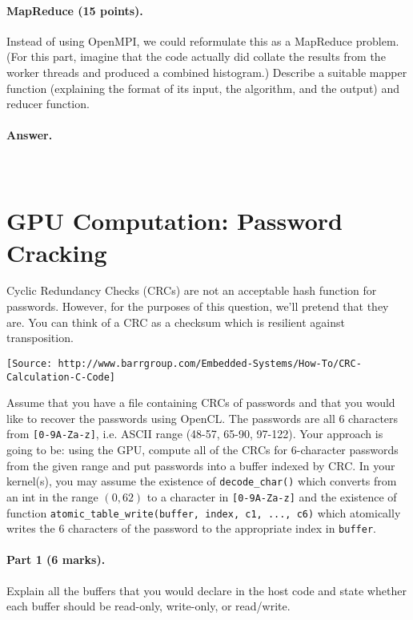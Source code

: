 \documentclass[12pt]{article}
\begin{document}
\paragraph{MapReduce (15 points).} Instead of using OpenMPI,
we could reformulate this as a MapReduce problem. (For this part, imagine that the
code actually did collate the results from the worker threads and
produced a combined histogram.)  Describe a suitable mapper function
(explaining the format of its input, the algorithm, and the output)
and reducer function.

\paragraph{Answer.}~
\newpage

\section{GPU Computation: Password Cracking}
Cyclic Redundancy Checks (CRCs) are not an acceptable hash function
for passwords. However, for the purposes of this question, we'll
pretend that they are. You can think of a CRC as a checksum which is
resilient against transposition. 

{\scriptsize \verb+[Source: http://www.barrgroup.com/Embedded-Systems/How-To/CRC-Calculation-C-Code]+}

Assume that you have a file containing CRCs of passwords and that you
would like to recover the passwords using OpenCL. The
passwords are all 6 characters from \verb+[0-9A-Za-z]+, i.e. ASCII
range (48-57, 65-90, 97-122). Your approach is going to be: using the
GPU, compute all of the CRCs for 6-character passwords from the given
range and put passwords into a buffer indexed by CRC. In your kernel(s), you may assume the existence of {\tt decode\_char()} which converts from an int
in the range $(0, 62)$ to
a character in \verb+[0-9A-Za-z]+ and the existence of function {\tt atomic\_table\_write(buffer, index, c1, ..., c6)} which atomically writes the 6 characters of the
password to the appropriate index in {\tt buffer}.

\paragraph{Part 1 (6 marks).} Explain all the buffers that you would
declare in the host code and state whether each buffer should be
read-only, write-only, or read/write.

~\\[5em]
\end{document}
